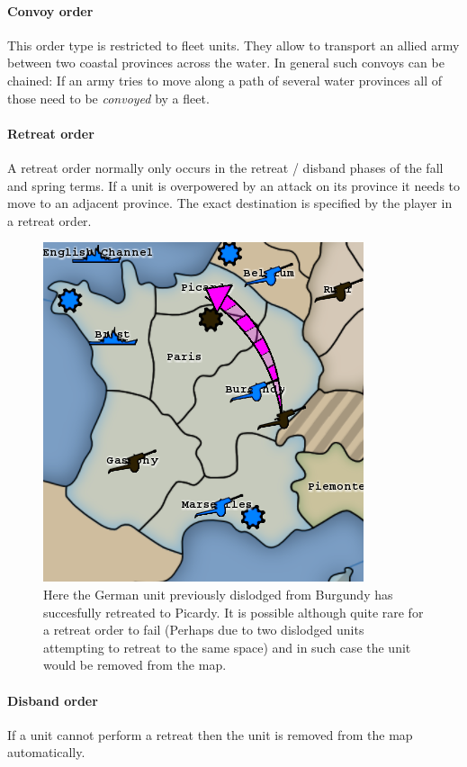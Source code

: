 \documentclass[pdftex,11pt,a4paper]{report}
\begin{document}
\paragraph{Convoy order}
This order type is restricted to fleet units. They allow to transport
an allied army between two coastal provinces across the water. In general
such convoys can be chained: If an army tries to move along a path of
several water provinces all of those need to be \textit{convoyed} 
by a fleet.

\paragraph{Retreat order}
A retreat order normally only occurs in the retreat / disband phases of the
fall and spring terms. If a unit is overpowered by an attack on its
province it needs to move to an adjacent province. The exact destination
is specified by the player in a retreat order.

\begin{figure}
\includegraphics[scale=0.75]{./screenshots/DefRetreat2.png} \\[1cm] 
Here the German unit previously dislodged from Burgundy has
succesfully retreated to Picardy.  It is possible although quite rare
for a retreat order to fail (Perhaps due to two dislodged units
attempting to retreat to the same space) and in such case the unit
would be removed from the map.
\end{figure}

\paragraph{Disband order}
If a unit cannot perform a retreat then the unit is removed from the
map automatically.
\end{document}

